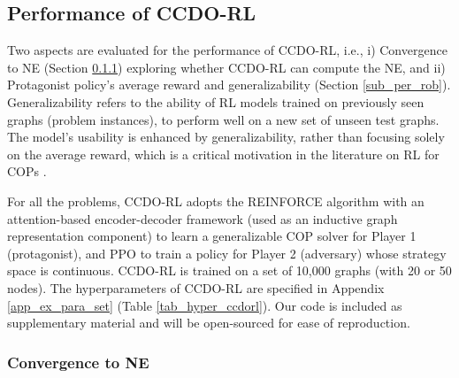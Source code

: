 \subsection{Performance of CCDO-RL}\label{sub_train_eval}

Two aspects are evaluated for the performance of CCDO-RL, i.e., i) Convergence to NE (Section \ref{sub_per_conver}) exploring whether CCDO-RL can compute the NE, and ii) Protagonist policy's average reward and generalizability (Section \ref{sub_per_rob}). Generalizability refers to the ability of RL models trained on previously seen graphs (problem instances), to perform well on a new set of unseen test graphs. The model’s usability is enhanced by generalizability, rather than focusing solely on the average reward, which is a critical motivation in the literature on RL for COPs \citep{khalil2017learning, kool2018attention}.

For all the problems, CCDO-RL adopts the REINFORCE algorithm with an attention-based encoder-decoder framework \citep{kool2018attention} (used as an inductive graph representation component) to learn a generalizable COP solver for Player 1 (protagonist), and PPO to train a policy for Player 2 (adversary) whose strategy space is continuous. CCDO-RL is trained on a set of 10,000 graphs (with 20 or 50 nodes). The hyperparameters of CCDO-RL are specified in Appendix \ref{app_ex_para_set} (Table \ref{tab_hyper_ccdorl}). Our code is included as supplementary material and will be open-sourced for ease of reproduction. 



\subsubsection{Convergence to NE} \label{sub_per_conver}

